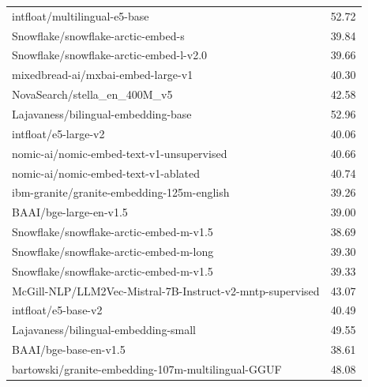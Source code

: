 \begin{xltabular}{\textwidth}{X c}
    intfloat/multilingual-e5-base                                        & 52.72                    \\
    Snowflake/snowflake-arctic-embed-s                                   & 39.84                    \\
    Snowflake/snowflake-arctic-embed-l-v2.0                              & 39.66                    \\
    mixedbread-ai/mxbai-embed-large-v1                                   & 40.30                    \\
    NovaSearch/stella\_en\_400M\_v5                                      & 42.58                    \\
    Lajavaness/bilingual-embedding-base                                  & 52.96                    \\
    intfloat/e5-large-v2                                                 & 40.06                    \\
    nomic-ai/nomic-embed-text-v1-unsupervised                            & 40.66                    \\
    nomic-ai/nomic-embed-text-v1-ablated                                 & 40.74                    \\
    ibm-granite/granite-embedding-125m-english                           & 39.26                    \\
    BAAI/bge-large-en-v1.5                                               & 39.00                    \\
    Snowflake/snowflake-arctic-embed-m-v1.5                              & 38.69                    \\
    Snowflake/snowflake-arctic-embed-m-long                              & 39.30                    \\
    Snowflake/snowflake-arctic-embed-m-v1.5                              & 39.33                    \\
    McGill-NLP/LLM2Vec-Mistral-7B-Instruct-v2-mntp-supervised            & 43.07                    \\
    intfloat/e5-base-v2                                                  & 40.49                    \\
    Lajavaness/bilingual-embedding-small                                 & 49.55                    \\
    BAAI/bge-base-en-v1.5                                                & 38.61                    \\
    bartowski/granite-embedding-107m-multilingual-GGUF                   & 48.08                    \\

\end{xltabular}
